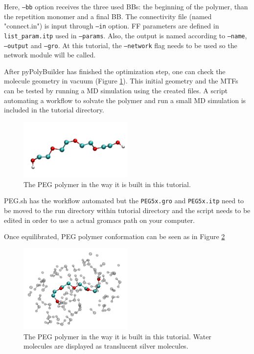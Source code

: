 Here, \texttt{--bb} option receives the three used BBs: the beginning of the polymer, than the repetition monomer and a final BB.
The connectivity file (named "connect.in") is input through \texttt{--in} option.
FF parameters are defined in \texttt{list\_param.itp} used in \texttt{--params}.
Also, the output is named according to \texttt{--name}, \texttt{--output} and \texttt{--gro}.
At this tutorial, the \texttt{--network} flag needs to be used so the network module will be called.

After pyPolyBuilder has finished the optimization step, one can check the molecule geometry in vacuum (Figure \ref{fig:PEGPPB}). 
This initial geometry and the MTFs can be tested by running a MD simulation using the created files.
A script automating a workflow to solvate the polymer and  run a small MD simulation is included in the tutorial directory.

\begin{figure}
    \center
    \includegraphics[width=0.5\textwidth]{PEG/PEGPPB.png}
    \caption{The PEG polymer in the way it is built in this tutorial.}
    \label{fig:PEGPPB}
\end{figure}

PEG.sh has the workflow automated but the \texttt{PEG5x.gro} and \texttt{PEG5x.itp} need to be moved to the run directory within tutorial directory and the script needs to be edited in order to use a actual gromacs path on your computer.

Once equilibrated, PEG polymer conformation can be seen as in Figure \ref{fig:PEGSOL}

\begin{figure}
    \center
    \includegraphics[width=0.5\textwidth]{PEG/PEGSOL.png}
    \caption{The PEG polymer in the way it is built in this tutorial. Water molecules are displayed as translucent silver molecules.}
    \label{fig:PEGSOL}
\end{figure}